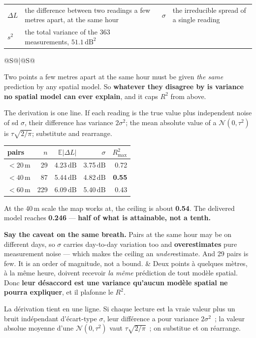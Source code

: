 \documentclass[10pt,a4paper]{article}
\makeatletter
\newenvironment{where}{%
  \par\vspace{.5mm}{\footnotesize\color{muted}\textsc{where}}\par\vspace{.8mm}
  \begin{tabular}{@{}p{20mm}p{62mm}@{\hspace{6mm}}p{20mm}p{62mm}@{}}
}{%
  \end{tabular}\par\vspace{2mm}}
\newenvironment{say}{%
  \begin{tabular}{@{}S@{\hspace{5mm}}|@{\hspace{5mm}}S@{}}
}{%
  \end{tabular}\par}
\newcommand{\dB}{\ensuremath{\,\mathrm{dB}}}  %
\newcommand{\must}[1]{{\color{good}\textbf{#1}}}
\newcommand{\care}[1]{{\color{warn}\textbf{#1}}}
\makeatother
\begin{document}
\begin{where}
  $\Delta L$ & the difference between two readings a few metres apart, at the
               same hour &
  $\sigma$ & the irreducible spread of a single reading \\
  $s^{2}$ & the total variance of the 363 measurements, $51.1\dB^{2}$ &
  & \\
\end{where}
\begin{say}
Two points a few metres apart at the same hour must be given \emph{the same}
prediction by any spatial model. So \must{whatever they disagree by is variance no
spatial model can ever explain}, and it caps $R^{2}$ from above.

The derivation is one line. If each reading is the true value plus independent
noise of sd $\sigma$, their difference has variance $2\sigma^{2}$; the mean
absolute value of a $\mathcal{N}(0,\tau^{2})$ is $\tau\sqrt{2/\pi}$; substitute
and rearrange.

\begin{center}\footnotesize
\begin{tabular}{@{}lrrrr@{}}
  \toprule
  pairs & $n$ & $\mathbb{E}|\Delta L|$ & $\sigma$ & $R^{2}_{\max}$ \\
  \midrule
  $<20$\,m & 29 & 4.23\dB & 3.75\dB & 0.72 \\
  $<40$\,m & 87 & 5.44\dB & 4.82\dB & \must{0.55} \\
  $<60$\,m & 229 & 6.09\dB & 5.40\dB & 0.43 \\
  \bottomrule
\end{tabular}
\end{center}

At the 40\,m scale the map works at, the ceiling is about \must{0.54}. The
delivered model reaches \must{0.246} --- \must{half of what is attainable, not a
tenth.}

\care{Say the caveat on the same breath.} Pairs at the same hour may be on
different days, so $\sigma$ carries day-to-day variation too and
\care{overestimates} pure measurement noise --- which makes the ceiling an
\emph{under}estimate. And 29 pairs is few. It is an order of magnitude, not a
bound.
&
Deux points à quelques mètres, à la même heure, doivent recevoir \emph{la même}
prédiction de tout modèle spatial. Donc \must{leur désaccord est une variance
qu'aucun modèle spatial ne pourra expliquer}, et il plafonne le $R^{2}$.

La dérivation tient en une ligne. Si chaque lecture est la vraie valeur plus un
bruit indépendant d'écart-type $\sigma$, leur différence a pour variance
$2\sigma^{2}$~; la valeur absolue moyenne d'une $\mathcal{N}(0,\tau^{2})$ vaut
$\tau\sqrt{2/\pi}$~; on substitue et on réarrange.


\end{say}
\end{document}
